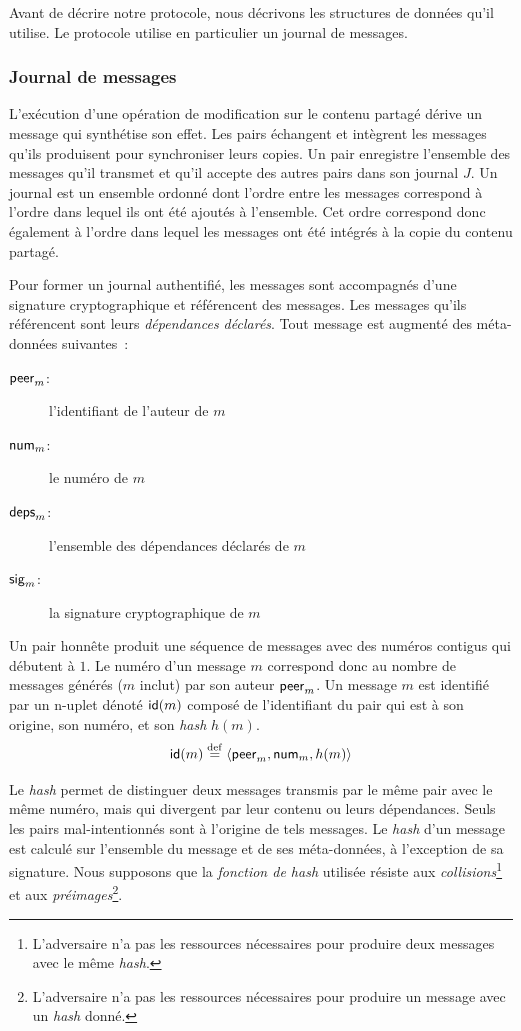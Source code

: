 Avant de décrire notre protocole, nous décrivons les structures de données qu'il utilise.
Le protocole utilise en particulier un journal de messages.

\subsubsection{Journal de messages}

L'exécution d'une opération de modification sur le contenu partagé dérive un message qui synthétise son effet.
Les pairs échangent et intègrent les messages qu'ils produisent pour synchroniser leurs copies.
Un pair enregistre l’ensemble des messages qu'il transmet et qu'il accepte des autres pairs dans son journal $J$.
Un journal est un ensemble ordonné dont l'ordre entre les messages correspond à l'ordre dans lequel ils ont été ajoutés à l'ensemble.
Cet ordre correspond donc également à l'ordre dans lequel les messages ont été intégrés à la copie du contenu partagé.

Pour former un journal authentifié, les messages sont accompagnés d'une signature cryptographique et référencent des messages.
Les messages qu'ils référencent sont leurs \emph{dépendances déclarés}.
Tout message est augmenté des méta-données suivantes~:
\begin{description}
    \item[$\trm{peer}_m$:] l'identifiant de l'auteur de $m$ 
    \item[$\trm{num}_m$:] le numéro de $m$
    \item[$\trm{deps}_m$:] l'ensemble des dépendances déclarés de $m$
    \item[$\trm{sig}_m$:] la signature cryptographique de $m$
\end{description}

Un pair honnête produit une séquence de messages avec des numéros contigus qui débutent à $1$.
Le numéro d'un message $m$ correspond donc au nombre de messages générés ($m$ inclut) par son auteur $\trm{peer}_m$.
Un message $m$ est identifié par un n-uplet dénoté $\trm{id}(m)$ composé de l'identifiant du pair qui est à son origine, son numéro, et son \emph{hash} $h(m)$.
%
\begin{equation*}
    \trm{id}(m) \defeq \tuple*{\trm{peer}_m, \trm{num}_m, h(m)}
\end{equation*}

Le \emph{hash} permet de distinguer deux messages transmis par le même pair avec le même numéro, mais qui divergent par leur contenu ou leurs dépendances.
Seuls les pairs mal-intentionnés sont à l'origine de tels messages.
Le \emph{hash} d'un message est calculé sur l'ensemble du message et de ses méta-données, à l'exception de sa signature.
Nous supposons que la \emph{fonction de hash} utilisée résiste aux \emph{collisions}\footnote{L'adversaire n'a pas les ressources nécessaires pour produire deux messages avec le même \emph{hash}.} et aux \emph{préimages}\footnote{L'adversaire n'a pas les ressources nécessaires pour produire un message avec un \emph{hash} donné.}.

